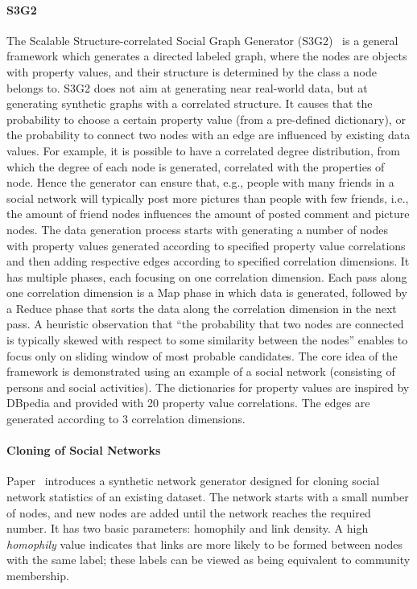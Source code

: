 \paragraph{S3G2} The Scalable Structure-correlated Social Graph Generator
(S3G2)~\cite{Pham2013} is a general framework which  generates a directed
labeled graph, where the nodes are objects with property values, and their
structure is determined by the class a node belongs to. S3G2 does not aim at
generating near real-world data, but at generating synthetic graphs with a
correlated structure. It causes that the probability to choose a certain
property value (from a pre-defined dictionary), or the probability to connect
two nodes with an edge are influenced by existing data values. For example, it
is possible to have a correlated degree distribution, from which the degree of
each node is generated, correlated with the properties of node. Hence the generator
can ensure that, e.g., people with many friends in a social network will
typically post more pictures than people with few friends, i.e., the amount of
friend nodes influences the amount of posted comment and picture nodes. The data generation process starts with generating a number of nodes with
property values generated according to specified property value correlations and
then adding respective edges according to specified correlation dimensions. It
has multiple phases, each focusing on one correlation dimension. Each pass along
one correlation dimension is a Map phase in which data is generated, followed by
a Reduce phase that sorts the data along the correlation dimension in the next
pass. A heuristic observation that ``the probability that two nodes are
connected is typically skewed with respect to some similarity between the
nodes'' enables to focus only on sliding window of most probable candidates. The core idea of the framework is demonstrated using an example of a social
network (consisting of persons and social activities).  The dictionaries for
property values are inspired by DBpedia and provided with 20 property value
correlations. The edges are generated according to 3 correlation dimensions.


\paragraph{Cloning of Social Networks} Paper~\cite{Sukthankar-SocialInfo2014}
introduces a synthetic network generator designed for cloning social network
statistics of an existing dataset. The network starts with a small number of
nodes, and new nodes are added until the network reaches the required number. It
has two basic parameters: homophily and link density. A high \emph{homophily}
value indicates that links are more likely to be formed between nodes with the
same label; these labels can be viewed as being equivalent to community
membership.

